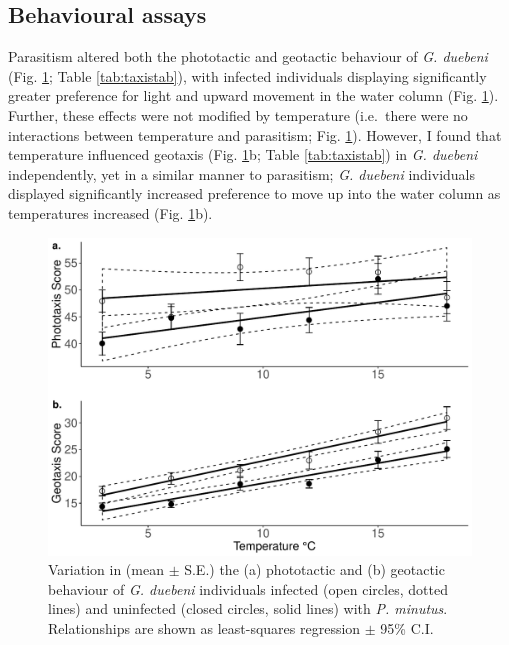 \subsection{Behavioural assays}
Parasitism altered both the phototactic and geotactic behaviour of \emph{G. duebeni} (Fig. \ref{fig:taxis}; Table \ref{tab:taxistab}), with infected individuals displaying significantly greater preference for light and upward movement in the water column (Fig. \ref{fig:taxis}). Further, these effects were not modified by temperature (i.e.\ there were no interactions between temperature and parasitism; Fig. \ref{fig:taxis}). However, I found that temperature influenced geotaxis (Fig. \ref{fig:taxis}b; Table \ref{tab:taxistab}) in \emph{G. duebeni} independently, yet in a similar manner to parasitism; \emph{G. duebeni} individuals displayed significantly increased preference to move up into the water column as temperatures increased (Fig. \ref{fig:taxis}b). 

\begin{figure}[H]
    \centering
    \includegraphics[keepaspectratio,width=\textwidth]{figures/ch2/taxis_1.pdf}
  \caption [Impact of temperature and parasitic infection on predator-avoidance behaviour]{Variation in (mean $\pm$ S.E.) the (a) phototactic and (b) geotactic behaviour of \emph{G. duebeni} individuals infected (open circles, dotted lines) and uninfected (closed circles, solid lines) with \emph{P. minutus}. Relationships are shown as least-squares regression $\pm$ 95\% C.I.} 
    \label{fig:taxis}
\end{figure}

